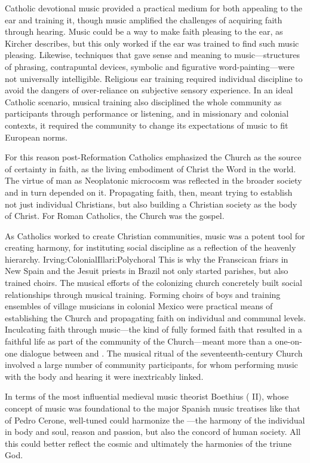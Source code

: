 Catholic devotional music provided a practical medium for both appealing to the 
ear and training it, though music amplified the challenges of acquiring faith 
through hearing.
Music could be a way to make faith pleasing to the ear, as Kircher  describes, 
but this only worked if the ear was trained to find such music pleasing.
Likewise, techniques that gave sense and meaning to music---structures of 
phrasing, contrapuntal devices, symbolic and figurative word-painting---were 
not universally intelligible.
Religious ear training required individual discipline to avoid the dangers of 
over-reliance on subjective sensory experience.
In an ideal Catholic scenario, musical training also disciplined the whole 
community as participants through performance or listening, and in missionary 
and colonial contexts, it required the community to change its expectations of 
music to fit European norms.

For this reason post-Reformation Catholics emphasized the Church as the source 
of certainty in faith, as the living embodiment of Christ the Word in the world.
The virtue of man as Neoplatonic microcosm was reflected in 
the broader society and in turn depended on it.
Propagating faith, then, meant trying to establish not just individual 
Christians, but also building a Christian society as the body of Christ.
For Roman Catholics, the Church was the gospel.

As Catholics worked to create Christian communities, music was a potent tool 
for creating harmony, for instituting social discipline as a reflection of the 
heavenly hierarchy.%
    \Autocite{Baker:Harmony}{Irving:Colonial}{Illari:Polychoral}
This is why the Franscican friars in New Spain and the Jesuit priests in Brazil 
not only started parishes, but also trained choirs.
The musical efforts of the colonizing church concretely built social 
relationships through musical training.
Forming choirs of boys and training ensembles of village musicians in colonial 
Mexico were practical means of establishing the Church and propagating faith on 
individual and communal levels.
Inculcating faith through music---the kind of fully formed faith that resulted 
in a faithful life as part of the community of the Church---meant more than a 
one-on-one dialogue between  and .
The musical ritual of the seventeenth-century Church involved a large number of 
community participants, for whom performing music with the body and hearing it 
were inextricably linked.

In terms of the most influential medieval music theorist Boethius 
( II), whose concept of music was foundational to the 
major Spanish music treatises like that of Pedro Cerone, well-tuned 
 could harmonize the 
---the harmony of the individual in body and soul, reason 
and passion, but also the concord of human society.%
    \Autocites
    [II: 187--189]{Boethius:Musica}
    [203--208]{Cerone:Melopeo}
    [22--31]{Baker:Harmony}
All this could better reflect the cosmic  and ultimately 
the harmonies of the triune God.

